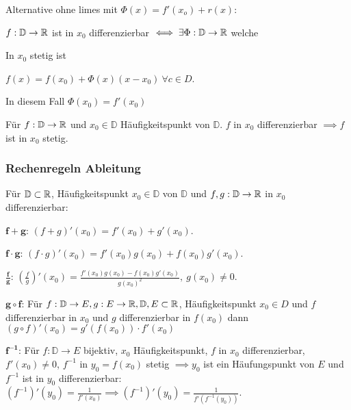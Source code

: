 Alternative ohne limes mit $\Phi(x) = f'(x_o) + r(x)$:
\begin{compactitem}
    \item $f: \mathbb{D} \to \mathbb{R}$ ist in $x_0$ differenzierbar $\iff \exists \Phi: \mathbb{D} \to \mathbb{R}$ welche
        \begin{inparaenum}
            \item In $x_0$ stetig ist
            \item $f(x) = f(x_0) + \Phi(x)(x - x_0) \ \forall c \in D$.
        \end{inparaenum}
        \begin{compactitem}
        \item In diesem Fall $\Phi(x_0) = f'(x_0)$
        \end{compactitem}
\end{compactitem}
\begin{compactitem}
    \item Für $f: \mathbb{D} \to \mathbb{R}$ und $x_0 \in \mathbb{D}$ Häufigkeitspunkt von $\mathbb{D}$. $f$ in $x_0$ differenzierbar $\implies f$ ist in $x_0$ stetig.
\end{compactitem}


\subsubsection{Rechenregeln Ableitung}
Für $\mathbb{D} \subset \mathbb{R}$, Häufigkeitspunkt $x_0 \in \mathbb{D}$ von $\mathbb{D}$ und $f,g: \mathbb{D} \to \mathbb{R}$ in $x_0$ differenzierbar:
\begin{compactdesc}
    \item[$\mathbf{f + g}$:] $(f + g)'(x_0) = f'(x_0) + g'(x_0)$.
    \item[$\mathbf{f \cdot g}$:] $(f \cdot g)'(x_0) = f'(x_0)g(x_0) + f(x_0)g'(x_0)$.
    \item[$\mathbf{\frac{f}{g}}$:] $\left( \frac{f}{g} \right)' (x_0) = \frac{f'(x_0)g(x_0) - f(x_0)g'(x_0)}{g(x_0)^2}, \ g(x_0) \neq 0$.
    \item[$\mathbf{g \circ f}$:] Für $f: \mathbb{D} \to E, g: E \to \mathbb{R}, \mathbb{D}, E \subset \mathbb{R}$, Häufigkeitspunkt $x_0 \in D$ und $f$ differenzierbar in $x_0$ und $g$ differenzierbar in $f(x_0)$ dann $(g \circ f)'(x_0) = g'(f(x_0)) \cdot f'(x_0)$
    \item[$\mathbf{f^{-1}}$:] Für $f:\mathbb{D} \to E$ bijektiv, $x_0$ Häufigkeitspunkt, $f$ in $x_0$ differenzierbar, $f'(x_0) \neq 0$, $f^{-1}$ in $y_0 = f(x_0)$ stetig $\implies y_0$ ist ein Häufungspunkt von $E$ und $f^{-1}$ ist in $y_0$ differenzierbar: $(f^{-1})'(y_0) = \frac{1}{f'(x_0)} \implies (f^{-1})'(y_0) = \frac{1}{f'(f^{-1}(y_0))}$.
\end{compactdesc}

